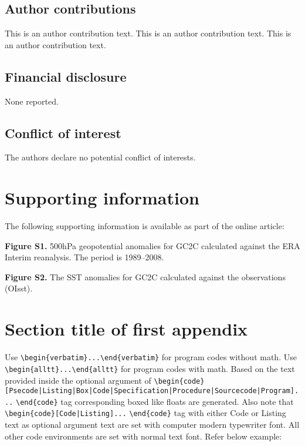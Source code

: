 \documentclass[proof]{WileyASNA-v1}
\begin{document}
\subsection*{Author contributions}

This is an author contribution text. This is an author contribution text. This is an author contribution text.  

\subsection*{Financial disclosure}

None reported.

\subsection*{Conflict of interest}

The authors declare no potential conflict of interests.


\section*{Supporting information}

The following supporting information is available as part of the online article:

\noindent
\textbf{Figure S1.}
{500{\uns}hPa geopotential anomalies for GC2C calculated against the ERA Interim reanalysis. The period is 1989--2008.}

\noindent
\textbf{Figure S2.}
{The SST anomalies for GC2C calculated against the observations (OIsst).}


\appendix

\section{Section title of first appendix\label{app1}}

Use \verb+\begin{verbatim}...\end{verbatim}+ for program codes without math. Use \verb+\begin{alltt}...\end{alltt}+ for program codes with math. Based on the text provided inside the optional argument of \verb+\begin{code}[Psecode|Listing|Box|Code|+\hfill\break \verb+Specification|Procedure|Sourcecode|Program]...+ \verb+\end{code}+ tag corresponding boxed like floats are generated. Also note that \verb+\begin{code}[Code|Listing]...+ \verb+\end{code}+ tag with either Code or Listing text as optional argument text are set with computer modern typewriter font.  All other code environments are set with normal text font. Refer below example:
\end{document}
